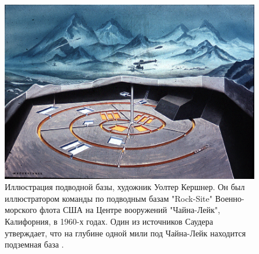 \documentclass[10pt,twocolumn,letterpaper]{article}
\begin{document}
\begin{figure}[t]
\begin{center}
   \includegraphics[width=1\linewidth]{undersea.jpg}
\end{center}
   \caption{Иллюстрация подводной базы, художник Уолтер Кершнер. Он был иллюстратором команды по подводным базам "Rock-Site" Военно-морского флота США на Центре вооружений "Чайна-Лейк", Калифорния, в 1960-х годах. Один из источников Саудера утверждает, что на глубине одной мили под Чайна-Лейк находится подземная база \cite{22,23}.}
\label{fig:5}
\label{fig:onecol}
\end{figure}
\end{document}
